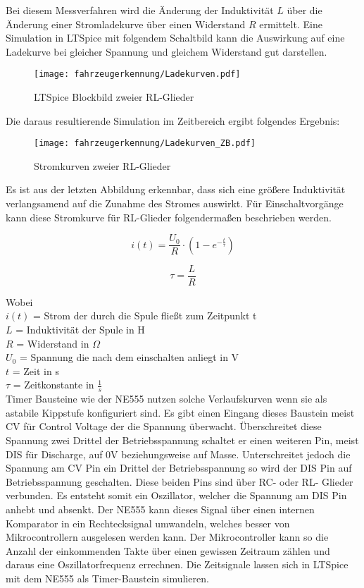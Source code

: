 Bei diesem Messverfahren wird die Änderung der Induktivität $L$ über die Änderung einer Stromladekurve über einen Widerstand
$R$ ermittelt. Eine Simulation in LTSpice mit folgendem Schaltbild kann die Auswirkung auf eine Ladekurve bei gleicher Spannung
und gleichem Widerstand gut darstellen.
\begin{figure}[H]
    \centering
    \texttt{[image: fahrzeugerkennung/Ladekurven.pdf]}
    \caption{LTSpice Blockbild zweier RL-Glieder}
\end{figure}
\pagebreak
Die daraus resultierende Simulation im Zeitbereich ergibt folgendes Ergebnis:

\begin{figure}[H]
    \centering
    \texttt{[image: fahrzeugerkennung/Ladekurven\_ZB.pdf]}
    \caption{Stromkurven zweier RL-Glieder}
\end{figure}

Es ist aus der letzten Abbildung erkennbar, dass sich eine größere Induktivität verlangsamend auf die Zunahme des Stromes auswirkt. Für Einschaltvorgänge kann diese Stromkurve
für RL-Glieder folgendermaßen beschrieben werden.

\begin{equation} \label{eq:i_L}
    i(t) = \frac{U_{0}}{R} \cdot (1 - e^{-\frac{t}{\tau}})
\end{equation}

\begin{equation} \label{eq:tau_RL}
    \tau = \frac{L}{R}
\end{equation} 

Wobei \\
$i(t)$ = Strom der durch die Spule fließt zum Zeitpunkt t \\
$L$ = Induktivität der Spule in H\\
$R$ = Widerstand in $\Omega$ \\
$U_0$ = Spannung die nach dem einschalten anliegt in V\\
$t$ = Zeit in s \\
$\tau$ = Zeitkonstante in $\frac{1}{s}$\\

Timer Bausteine wie der NE555 nutzen solche Verlaufskurven wenn sie als astabile Kippstufe konfiguriert sind.
Es gibt einen Eingang dieses Baustein meist CV für Control Voltage der die Spannung überwacht. Überschreitet diese Spannung zwei Drittel
der Betriebsspannung schaltet er einen weiteren Pin, meist DIS für Discharge, auf 0V beziehungsweise auf Masse. Unterschreitet jedoch 
die Spannung am CV Pin ein Drittel der Betriebsspannung so wird der DIS Pin auf Betriebsspannung geschalten. Diese beiden Pins 
sind über RC- oder RL- Glieder verbunden. Es entsteht somit ein Oszillator, welcher die Spannung am DIS Pin anhebt und absenkt.
Der NE555 kann dieses Signal über einen internen Komparator in ein Rechtecksignal umwandeln, welches besser von Mikrocontrollern ausgelesen
werden kann. Der Mikrocontroller kann so die Anzahl der einkommenden Takte über einen gewissen Zeitraum zählen und daraus eine Oszillatorfrequenz errechnen.
Die Zeitsignale lassen sich in LTSpice mit dem NE555 als Timer-Baustein simulieren.

